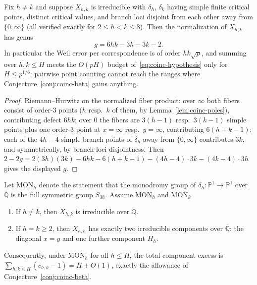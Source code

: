 \begin{proposition}
\label{prop:coinc-genus}
Fix $h\ne k$ and suppose $X_{h,k}$ is irreducible with $\delta_h$,
$\delta_k$ having simple finite critical points, distinct critical
values, and branch loci disjoint from each other away from
$\{0,\infty\}$ (all verified exactly for $2\le h<k\le8$).  Then the
normalization of $X_{h,k}$ has genus
\[
 g=6hk-3h-3k-2 .
\]
In particular the Weil error per correspondence is of order $hk\sqrt p$,
and summing over $h,k\le H$ meets the $O(pH)$ budget
of~\eqref{eq:coinc-hypothesis} only for $H\le p^{1/6}$: pairwise point
counting cannot reach the ranges where
Conjecture~\ref{conj:coinc-beta} gains anything.
\end{proposition}

\begin{proof}
Riemann--Hurwitz on the normalized fiber product: over $\infty$ both
fibers consist of order-$3$ points ($h$ resp.\ $k$ of them, by
Lemma~\ref{lem:coinc-poles}), contributing defect $6hk$; over $0$ the
fibers are $3(h-1)$ resp.\ $3(k-1)$ simple points plus one order-$3$
point at $x=\infty$ resp.\ $y=\infty$, contributing $6(h+k-1)$; each of
the $4h-4$ simple branch points of $\delta_h$ away from $\{0,\infty\}$
contributes $3k$, and symmetrically, by branch-loci disjointness.  Then
$2-2g=2(3h)(3k)-6hk-6(h+k-1)-(4h-4)\cdot3k-(4k-4)\cdot3h$ gives the
displayed $g$.
\end{proof}

\begin{theorem}
\label{thm:coinc-components}
Let $\mathrm{MON}_h$ denote the statement that the monodromy group of
$\delta_h:\mathbb P^1\to\mathbb P^1$ over $\overline{\mathbb Q}$ is the
full symmetric group $S_{3h}$.  Assume $\mathrm{MON}_h$ and
$\mathrm{MON}_k$.
\begin{enumerate}
\item If $h\ne k$, then $X_{h,k}$ is irreducible over
$\overline{\mathbb Q}$.
\item If $h=k\ge2$, then $X_{h,h}$ has exactly two irreducible
components over $\overline{\mathbb Q}$: the diagonal $x=y$ and one
further component $H_h$.
\end{enumerate}
Consequently, under $\mathrm{MON}_h$ for all $h\le H$, the total
component excess is $\sum_{h,k\le H}(c_{h,k}-1)=H+O(1)$, exactly the
allowance of Conjecture~\ref{conj:coinc-beta}.
\end{theorem}

